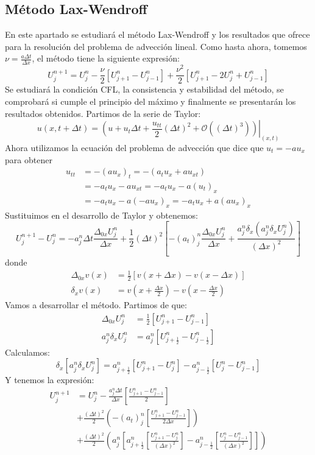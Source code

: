 \documentclass[spanish]{mathnotes}
\begin{document}
	\subsection{Método Lax-Wendroff}
	En este apartado se estudiará el método Lax-Wendroff y los resultados que ofrece para la resolución del problema de advección lineal. Como hasta ahora, tomemos $\nu = \frac{a\Delta t}{\Delta x}$, el método tiene la siguiente expresión:
	$$U_j^{n+1} = U_j^n - \frac{\nu}{2}\left[U_{j+1}^n-U_{j-1}^n\right] + \frac{\nu^2}{2}\left[U_{j+1}^{n}-2U_{j}^{n}+U_{j-1}^{n}\right]$$
	Se estudiará la condición CFL, la consistencia y estabilidad del método, se comprobará si cumple el principio del máximo y finalmente se presentarán los resultados obtenidos.
	Partimos de la serie de Taylor:
	$$u(x,t+\Delta t) = \left.\left(u+u_t\Delta t + \frac{u_{tt}}{2}(\Delta t )^2 + \mathcal{O}((\Delta t)^3)\right)\right|_{(x,t)}$$
	Ahora utilizamos la ecuación del problema de advección que dice que $u_t = -au_x$ para obtener
	\begin{align*}
		u_{tt} &= -(au_x)_t = -(a_tu_x+au_{xt})\\
		&= -a_tu_x-au_{xt} = -a_tu_x-a(u_t)_x\\
		&= -a_tu_x-a(-au_x)_x = -a_tu_x+a(au_x)_x
	\end{align*}
	Sustituimos en el desarrollo de Taylor y obtenemos:
	$$U_{j}^{n+1}-U_{j}^{n} = -a_j^n\Delta t\frac{\Delta_{0x}U_{j}^{n}}{\Delta x}+\frac{1}{2}(\Delta t)^2\left[-(a_t)_j^n\frac{\Delta_{0x}U_{j}^{n}}{\Delta x}+\frac{a_j^n\delta_x(a_j^n\delta_xU_{j}^{n})}{(\Delta x)^2}\right]$$
	donde
	\begin{align*}
		\Delta_{0x} v(x) &= \frac{1}{2}\left[v\left(x+\Delta x\right)-v\left(x-\Delta x\right)\right]\\
		\delta_x v(x) &= v\left(x+\frac{\Delta x}{2}\right)-v\left(x-\frac{\Delta x}{2}\right)
	\end{align*}
	Vamos a desarrollar el método. Partimos de que:
	\begin{align*}
		\Delta_{0x}U_j^n &= \frac{1}{2}\left[U_{j+1}^{n}-U_{j-1}^{n}\right]\\
		a_j^n\delta_xU_j^n &= a_j^n\left[U_{j+\frac{1}{2}}^{n}-U_{j-\frac{1}{2}}^{n}\right]
	\end{align*}
	Calculamos:
	$$\delta_x\left[a_j^n \delta_xU_{j}^{n}\right] = a_{j+\frac{1}{2}}^n \left[U_{j+1}^{n}-U_{j}^{n}\right] -  a_{j-\frac{1}{2}}^n \left[U_{j}^{n}-U_{j-1}^{n}\right]$$
	Y tenemos la expresión:
	\begin{align*}
		U_{j}^{n+1} &= U_{j}^{n} -\frac{a_j^n\Delta t}{\Delta x}\left[\frac{U_{j+1}^{n}-U_{j-1}^{n}}{2}\right]\\
		&+ \frac{(\Delta t)^2}{2}\left(-(a_t)_j^n\left[\frac{U_{j+1}^n-U_{j-1}^n}{2\Delta x}\right]\right)\\
		&+ \frac{(\Delta t)^2}{2}\left(a_j^n\left[a_{j+\frac{1}{2}}^n\left[\frac{U_{j+1}^n-U_j^n}{(\Delta x)^2}\right]-a_{j-\frac{1}{2}}^n\left[\frac{U_{j}^{n}-U_{j-1}^{n}}{(\Delta x)^2}\right]\right]\right)
	\end{align*}
\end{document}
